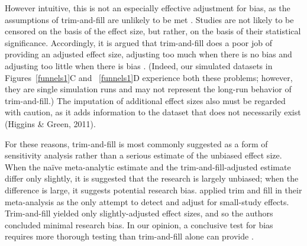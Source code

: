 \documentclass[man]{apa6}
\begin{document}
However intuitive, this is not an especially effective adjustment for bias, as the assumptions of trim-and-fill are unlikely to be met \citep{Simonsohn:etal:2014b}. Studies are not likely to be censored on the basis of the effect size, but rather, on the basis of their statistical significance. Accordingly, it is argued that trim-and-fill does a poor job of providing an adjusted effect size, adjusting too much when there is no bias and adjusting too little when there is bias \citep{Simonsohn:etal:2014b}. %
(Indeed, our simulated datasets in Figures~\ref{funnels1}C and ~\ref{funnels1}D experience both these problems; however, they are single simulation runs and may not represent the long-run behavior of trim-and-fill.) %
The imputation of additional effect sizes also must be regarded with caution, as it adds information to the dataset that does not necessarily exist (Higgins \& Green, 2011). 
\nocite{Higgins:Green:2011}

For these reasons, trim-and-fill is most commonly suggested as a form of sensitivity analysis rather than a serious estimate of the unbiased effect size. When the na{\"i}ve meta-analytic estimate and the trim-and-fill-adjusted estimate differ only slightly, it is suggested that the research is largely unbiased; when the difference is large, it suggests potential research bias.
\citet{Anderson:etal:2010} applied trim and fill in their meta-analysis as the only attempt to detect and adjust for small-study effects. Trim-and-fill yielded only slightly-adjusted effect sizes, and so the authors concluded minimal research bias.  %
In our opinion, a conclusive test for bias requires more thorough testing than trim-and-fill alone can provide \citep[c.f.,][]{Bushman:Huesmann:2014}.
\end{document}
